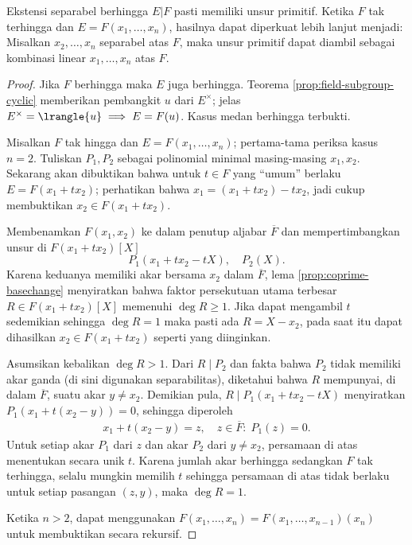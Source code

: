 \begin{theorem}\label{prop:prim-element-separable}
	Ekstensi separabel berhingga $E|F$ pasti memiliki unsur primitif. Ketika $F$ tak terhingga dan $E=F(x_1, \ldots, x_n)$, hasilnya dapat diperkuat lebih lanjut menjadi: Misalkan $x_2, \ldots, x_n$ separabel atas $F$, maka unsur primitif dapat diambil sebagai kombinasi linear $x_1, \ldots, x_n$ atas $F$.
\end{theorem}
\begin{proof}
	Jika $F$ berhingga maka $E$ juga berhingga. Teorema \ref{prop:field-subgroup-cyclic} memberikan pembangkit $u$ dari $E^\times$; jelas $E^\times = \lrangle{u} \implies E=F(u)$. Kasus medan berhingga terbukti.
	
	Misalkan $F$ tak hingga dan $E=F(x_1, \ldots, x_n)$; pertama-tama periksa kasus $n=2$. Tuliskan $P_1, P_2$ sebagai polinomial minimal masing-masing $x_1, x_2$. Sekarang akan dibuktikan bahwa untuk $t \in F$ yang ``umum'' berlaku $E=F(x_1 + tx_2)$; perhatikan bahwa $x_1 = (x_1 + tx_2) - tx_2$, jadi cukup membuktikan $x_2 \in F(x_1 + tx_2)$.
	
	Membenamkan $F(x_1, x_2)$ ke dalam penutup aljabar $\overline{F}$ dan mempertimbangkan unsur di $F(x_1 + tx_2)[X]$
	\[ P_1(x_1 + tx_2 - tX), \quad P_2(X). \]
	Karena keduanya memiliki akar bersama $x_2$ dalam $\overline{F}$, lema \ref{prop:coprime-basechange} menyiratkan bahwa faktor persekutuan utama terbesar $R \in F(x_1 + tx_2)[X]$ memenuhi $\deg R \geq 1$. Jika dapat mengambil $t$ sedemikian sehingga $\deg R=1$ maka pasti ada $R = X-x_2$, pada saat itu dapat dihasilkan $x_2 \in F(x_1 + tx_2)$ seperti yang diinginkan.
	
	Asumsikan kebalikan $\deg R > 1$. Dari $R \mid P_2$ dan fakta bahwa $P_2$ tidak memiliki akar ganda (di sini digunakan separabilitas), diketahui bahwa $R$ mempunyai, di dalam $\overline{F}$, suatu akar $y \neq x_2$. Demikian pula, $R \mid P_1(x_1 + tx_2 - tX)$ menyiratkan $P_1(x_1 + t(x_2-y))=0$, sehingga diperoleh
	\begin{gather*}
		x_1 + t(x_2 - y) = z, \quad z \in \overline{F}:\; P_1(z)=0.
	\end{gather*}
	Untuk setiap akar $P_1$ dari $z$ dan akar $P_2$ dari $y \neq x_2$, persamaan di atas menentukan secara unik $t$. Karena jumlah akar berhingga sedangkan $F$ tak terhingga, selalu mungkin memilih $t$ sehingga persamaan di atas tidak berlaku untuk setiap pasangan $(z,y)$, maka $\deg R = 1$.
	
	Ketika $n > 2$, dapat menggunakan $F(x_1, \ldots, x_n) = F(x_1, \ldots, x_{n-1})(x_n)$ untuk membuktikan secara rekursif.
\end{proof}


